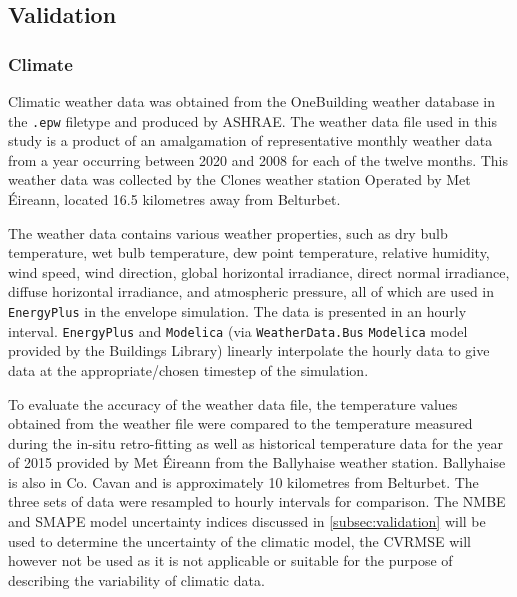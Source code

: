 \subsection{Validation} \label{subsubsec:validation}

\subsubsection{Climate}
Climatic weather data was obtained from the OneBuilding weather database \cite{onebuilding_climateonebuildingorg_nodate} in the \texttt{.epw} filetype and produced by ASHRAE. The weather data file used in this study is a product of an amalgamation of representative monthly weather data from a year occurring between 2020 and 2008 for each of the twelve months. This weather data was collected by the Clones weather station Operated by Met Éireann, located 16.5 kilometres away from Belturbet. 

The weather data contains various weather properties, such as dry bulb temperature, wet bulb temperature, dew point temperature, relative humidity, wind speed, wind direction, global horizontal irradiance, direct normal irradiance, diffuse horizontal irradiance, and atmospheric pressure, all of which are used in \texttt{EnergyPlus} in the envelope simulation. The data is presented in an hourly interval. \texttt{EnergyPlus} and \texttt{Modelica} (via \texttt{WeatherData.Bus} \texttt{Modelica} model provided by the Buildings Library) linearly interpolate the hourly data to give data at the appropriate/chosen timestep of the simulation. 

To evaluate the accuracy of the weather data file, the temperature values obtained from the weather file were compared to the temperature measured during the in-situ retro-fitting as well as historical temperature data for the year of 2015 provided by Met Éireann from the Ballyhaise weather station. Ballyhaise is also in Co. Cavan and is approximately 10 kilometres from Belturbet. The three sets of data were resampled to hourly intervals for comparison. The \ac{NMBE} and \ac{SMAPE} model uncertainty indices discussed in \cref{subsec:validation} will be used to determine the uncertainty of the climatic model, the \ac{CVRMSE} will however not be used as it is not applicable or suitable for the purpose of describing the variability of climatic data. 

